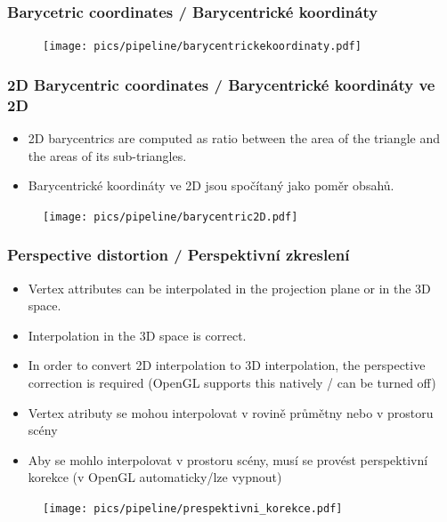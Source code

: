 \begin{frame}
\frametitle{Barycetric coordinates / Barycentrické koordináty}
	\begin{figure}[h]
		\texttt{[image: pics/pipeline/barycentrickekoordinaty.pdf]}
	\end{figure}
\end{frame}

\begin{frame}
\frametitle{2D Barycentric coordinates / Barycentrické koordináty ve 2D}
  \scriptsize
	\begin{itemize}
		\item 2D barycentrics are computed as ratio between the area of the triangle and the areas of its sub-triangles. 
	\end{itemize}
	\begin{itemize}
		\item Barycentrické koordináty ve 2D jsou spočítaný jako poměr obsahů.
	\end{itemize}
	\begin{figure}[h]
		\texttt{[image: pics/pipeline/barycentric2D.pdf]}
	\end{figure}
\end{frame}

\begin{frame}
\frametitle{Perspective distortion / Perspektivní zkreslení}
  \scriptsize
	\begin{itemize}
		\item Vertex attributes can be interpolated in the projection plane or in the 3D space.
    \item Interpolation in the 3D space is correct.
    \item In order to convert 2D interpolation to 3D interpolation, the perspective correction is required (OpenGL supports this natively / can be turned off)
	\end{itemize}
	\begin{itemize}
		\item Vertex atributy se mohou interpolovat v rovině průmětny nebo v prostoru scény
    \item Aby se mohlo interpolovat v prostoru scény, musí se provést perspektivní korekce
      (v OpenGL automaticky/lze vypnout)
	\end{itemize}
	\begin{figure}[h]
		\texttt{[image: pics/pipeline/prespektivni\_korekce.pdf]}
	\end{figure}
\end{frame}

